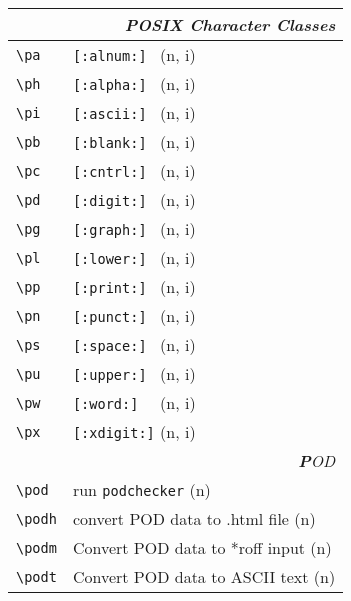 \documentclass[oneside,10pt,landscape,DIV17]{scrartcl}
\begin{document}
\begin{multicols}{3}
\begin{center}
\begin{tabular}[]{|p{11mm}|p{58mm}|}
\hline
\multicolumn{2}{|r|}{\textsl{\textbf{P}OSIX Character Classes}}\\[1.0ex]
\hline \verb'\pa' &  \verb'[:alnum:] '         \hfill (n, i)   \\
\hline \verb'\ph' &  \verb'[:alpha:] '         \hfill (n, i)   \\
\hline \verb'\pi' &  \verb'[:ascii:] '         \hfill (n, i)   \\
\hline \verb'\pb' &  \verb'[:blank:] '         \hfill (n, i)   \\
\hline \verb'\pc' &  \verb'[:cntrl:] '         \hfill (n, i)   \\
\hline \verb'\pd' &  \verb'[:digit:] '         \hfill (n, i)   \\
\hline \verb'\pg' &  \verb'[:graph:] '         \hfill (n, i)   \\
\hline \verb'\pl' &  \verb'[:lower:] '         \hfill (n, i)   \\
\hline \verb'\pp' &  \verb'[:print:] '         \hfill (n, i)   \\
\hline \verb'\pn' &  \verb'[:punct:] '         \hfill (n, i)   \\
\hline \verb'\ps' &  \verb'[:space:] '         \hfill (n, i)   \\
\hline \verb'\pu' &  \verb'[:upper:] '         \hfill (n, i)   \\
\hline \verb'\pw' &  \verb'[:word:]  '         \hfill (n, i)   \\
\hline \verb'\px' &  \verb'[:xdigit:]'         \hfill (n, i)   \\
\hline
\hline
\multicolumn{2}{|r|}{\textsl{\textbf{P}OD}}                       \\[1.0ex]
\hline \verb'\pod'    & run \verb'podchecker'           \hfill (n)\\
\hline \verb'\podh'   & convert POD data to .html file  \hfill (n)\\
\hline \verb'\podm'   & Convert POD data to *roff input \hfill (n)\\
\hline \verb'\podt'   & Convert POD data to ASCII text  \hfill (n)\\
\hline

\end{tabular}
\end{center}
\end{multicols}
\end{document}

